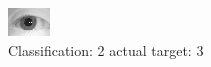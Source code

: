 \begin{figure}[h!]
\begin{center}
\includegraphics[width=0.60\columnwidth]{figures/ID1159_class_2_target_3.png}
\end{center}
\caption{ Classification: 2 actual target: 3}
\label{fig:ID1159_class_2_target_3}
\end{figure}
